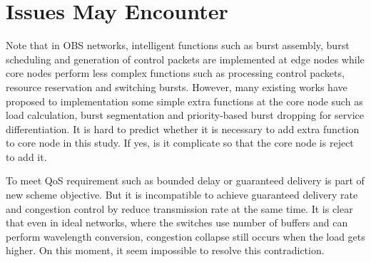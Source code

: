 \section{Issues May Encounter}

Note that in OBS networks, intelligent functions such as burst assembly, burst scheduling and generation of control packets are implemented at edge nodes while core nodes perform less complex functions such as processing control packets, resource reservation and switching bursts. However, many existing works have proposed to implementation some simple extra functions at the core node such as load calculation, burst segmentation and priority-based burst dropping for service differentiation.
It is hard to predict whether it is necessary to add extra function to core node in this study. If yes, is it complicate so that the core node is reject to add it.


To meet QoS requirement such as bounded delay or guaranteed delivery is part of new scheme objective. But it is incompatible to achieve guaranteed delivery rate and congestion control by reduce transmission rate at the same time. It is clear that even in ideal networks, where the switches use number of buffers and can perform wavelength conversion, congestion collapse still occurs when the load gets higher. On this moment, it seem impossible to resolve this contradiction.    

